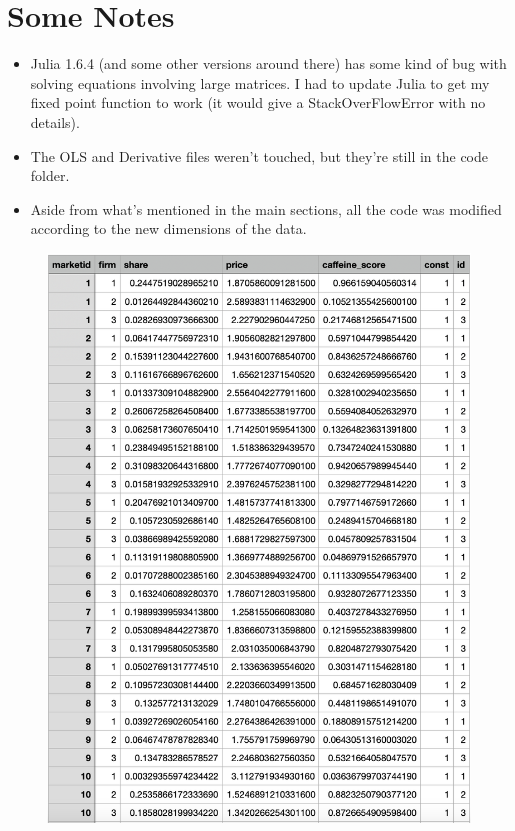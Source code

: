 \documentclass[12pt, letterpaper]{article}
\theoremstyle{definition}
\theoremstyle{remark}
\theoremstyle{definition}
\begin{document}
\section{Some Notes}
\begin{itemize}
	\item Julia 1.6.4 (and some other versions around there) has some kind of bug with solving equations involving large matrices. I had to update Julia to get my fixed point function to work (it would give a StackOverFlowError with no details).
	\item The OLS and Derivative files weren't touched, but they're still in the code folder.
	\item Aside from what's mentioned in the main sections, all the code was modified according to the new dimensions of the data.	
\end{itemize}


\begin{center}
	\begin{figure}
		\includegraphics{mergeddata.png}
	\end{figure}
\end{center}
\end{document}
